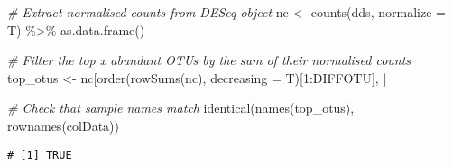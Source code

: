 \documentclass[
]{article}
\newenvironment{Shaded}{\begin{snugshade}}{\end{snugshade}}
\newcommand{\AttributeTok}[1]{\textcolor[rgb]{0.77,0.63,0.00}{#1}}
\newcommand{\CommentTok}[1]{\textcolor[rgb]{0.56,0.35,0.01}{\textit{#1}}}
\newcommand{\DecValTok}[1]{\textcolor[rgb]{0.00,0.00,0.81}{#1}}
\newcommand{\FunctionTok}[1]{\textcolor[rgb]{0.00,0.00,0.00}{#1}}
\newcommand{\NormalTok}[1]{#1}
\newcommand{\OtherTok}[1]{\textcolor[rgb]{0.56,0.35,0.01}{#1}}
\newcommand{\SpecialCharTok}[1]{\textcolor[rgb]{0.00,0.00,0.00}{#1}}
\begin{document}
\begin{Shaded}
\begin{Highlighting}[]
\CommentTok{\# Extract normalised counts from DESeq object}
\NormalTok{nc }\OtherTok{\textless{}{-}} \FunctionTok{counts}\NormalTok{(dds, }\AttributeTok{normalize =}\NormalTok{ T) }\SpecialCharTok{\%\textgreater{}\%} \FunctionTok{as.data.frame}\NormalTok{()}

\CommentTok{\# Filter the top x abundant OTUs by the sum of their normalised counts}
\NormalTok{top\_otus }\OtherTok{\textless{}{-}}\NormalTok{ nc[}\FunctionTok{order}\NormalTok{(}\FunctionTok{rowSums}\NormalTok{(nc), }\AttributeTok{decreasing =}\NormalTok{ T)[}\DecValTok{1}\SpecialCharTok{:}\NormalTok{DIFFOTU], ]}

\CommentTok{\# Check that sample names match}
\FunctionTok{identical}\NormalTok{(}\FunctionTok{names}\NormalTok{(top\_otus), }\FunctionTok{rownames}\NormalTok{(colData))}
\end{Highlighting}
\end{Shaded}

\begin{verbatim}
# [1] TRUE
\end{verbatim}
\end{document}
